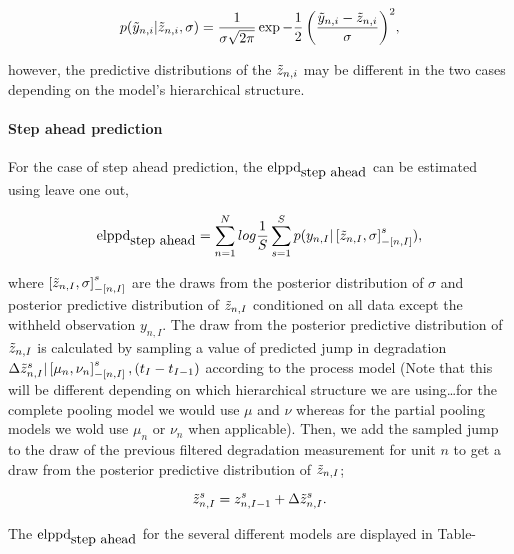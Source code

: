 \begin{equation} \label{ep:elppd_likelihood}
   p(\Tilde{y}_{n, i}|\Tilde{z}_{n, i}, \sigma) = \frac{1}{\sigma \sqrt{2\pi}}\exp{-\frac{1}{2}\left( \frac{\Tilde{y}_{n, i} - \Tilde{z}_{n, i}}{\sigma}\right)^2},
\end{equation}

however, the predictive distributions of the $\Tilde{z}_{n, i}$ may be different in the two cases depending on the model's hierarchical structure.

\paragraph{Step ahead prediction}

For the case of step ahead prediction, the $\hbox{elppd}_{\hbox{step ahead}}$ can be estimated using leave one out,

\begin{equation} \label{ep:elppd_loo_sa}
   \hbox{elppd}_{\hbox{step ahead}} = \sum^N_{n = 1} log \frac{1}{S} \sum^S_{s = 1} p(y_{n, I} | \left[\Tilde{z}_{n, I}, \sigma \right]_{-\left[ n, I \right]}^s),
\end{equation}

where $\left[\Tilde{z}_{n, I}, \sigma \right]_{-\left[ n, I \right]}^s$ are the draws from the posterior distribution of $\sigma$ and posterior predictive distribution of $\Tilde{z}_{n, I}$ conditioned on all data except the withheld observation $y_{n, I}$. The draw from the posterior predictive distribution of $\Tilde{z}_{n, I}$ is calculated by sampling a value of predicted jump in degradation $\Delta\Tilde{z}_{n, I}^s|\left[\mu_n, \nu_n \right]^s_{-\left[ n, I \right]}, (t_I - t_{I-1})$ according to the process model (Note that this will be different depending on which hierarchical structure we are using\ldots for the complete pooling model we would use $\mu$ and $\nu$ whereas for the partial pooling models we wold use $\mu_n$ or $\nu_n$ when applicable). Then, we add the sampled jump to the draw of the previous filtered degradation measurement for unit $n$ to get a draw from the posterior predictive distribution of $\Tilde{z}_{n, I}$;

\begin{equation} \label{ep:elppd_loo_sa}
   \Tilde{z}_{n, I}^s = z_{n, I - 1}^s + \Delta\Tilde{z}_{n, I}^s.
\end{equation}

The $\hbox{elppd}_{\hbox{step ahead}}$ for the several different models are displayed in Table-

